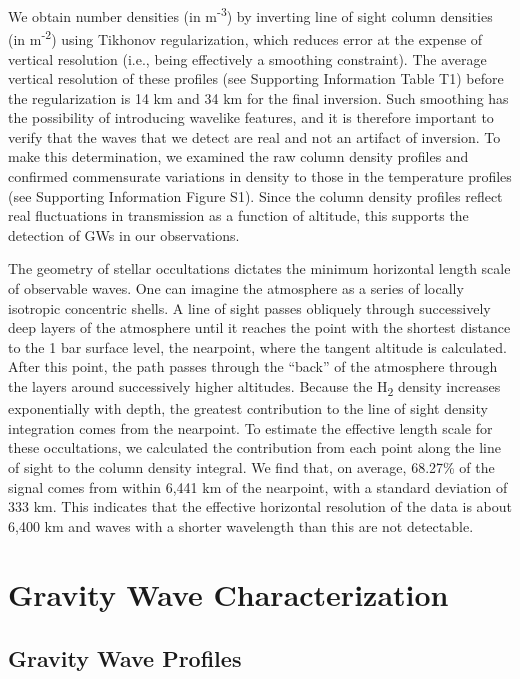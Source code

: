 We obtain number densities (in m\textsuperscript{-3}) by inverting line of sight column densities (in m\textsuperscript{-2}) using Tikhonov regularization, which reduces error at the expense of vertical resolution (i.e., being effectively a smoothing constraint). The average vertical resolution of these profiles (see Supporting Information Table T1) before the regularization is 14 km and 34 km for the final inversion. Such smoothing has the possibility of introducing wavelike features, and it is therefore important to verify that the waves that we detect are real and not an artifact of inversion. To make this determination, we examined the raw column density profiles and confirmed commensurate variations in density to those in the temperature profiles (see Supporting Information Figure S1). Since the column density profiles reflect real fluctuations in transmission as a function of altitude, this supports the detection of GWs in our observations.

The geometry of stellar occultations dictates the minimum horizontal length scale of observable waves. One can imagine the atmosphere as a series of locally isotropic concentric shells. A line of sight passes obliquely through successively deep layers of the atmosphere until it reaches the point with the shortest distance to the 1 bar surface level, the nearpoint, where the tangent altitude is calculated. After this point, the path passes through the ``back” of the atmosphere through the layers around successively higher altitudes. Because the H\textsubscript{2} density increases exponentially with depth, the greatest contribution to the line of sight density integration comes from the nearpoint. To estimate the effective length scale for these occultations, we calculated the contribution from each point along the line of sight to the column density integral. We find that, on average, 68.27\% of the signal comes from within 6,441 km of the nearpoint, with a standard deviation of 333 km. This indicates that the effective horizontal resolution of the data is about 6,400 km and waves with a shorter wavelength than this are not detectable.
\par

\section{Gravity Wave Characterization}
\label{sec:GWchar}
\subsection{Gravity Wave Profiles}
\label{sec:GW}

